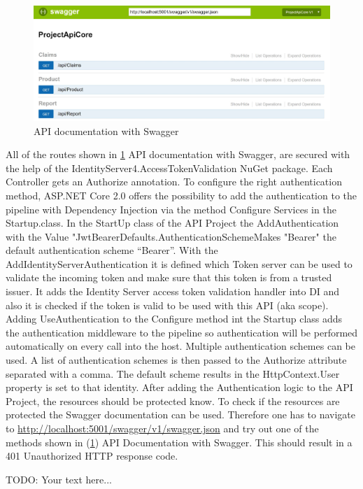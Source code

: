 \begin{figure}[h]
	\centering
	\includegraphics[width=0.7\linewidth]{images/apis}
	\caption{API documentation with Swagger}
	\label{fig:apis}
\end{figure}

All of the routes shown in \ref{fig:apis} API documentation with Swagger, are secured with the help of the IdentityServer4.AccessTokenValidation NuGet package. Each Controller gets an Authorize annotation. 
To configure the right authentication method, ASP.NET Core 2.0 offers the possibility to add the authentication to the pipeline with Dependency Injection via the method Configure Services in the Startup.class.
In the StartUp class of the API Project the AddAuthentication with the Value "JwtBearerDefaults.AuthenticationSchemeMakes "Bearer" the default authentication scheme “Bearer”. With the AddIdentityServerAuthentication it is defined which Token server can be used to validate the incoming token and make sure that this token is from a trusted issuer. It adds the Identity Server access token validation handler into DI and also it is checked if the token is valid to be used with this API (aka scope). Adding UseAuthentication to the Configure method int the Startup class adds the authentication middleware to the pipeline so authentication will be performed automatically on every call into the host.  Multiple authentication schemes can be used. A list of authentication schemes is then passed to the Authorize attribute separated with a comma. The default scheme results in the HttpContext.User property is set to that identity. After adding the Authentication logic to the API Project, the resources should be protected know. To check if the resources are protected the Swagger documentation can be used. Therefore one has to navigate to \url{http://localhost:5001/swagger/v1/swagger.json} and try out one of the methods shown in (\ref{fig:apis}) API Documentation with Swagger. This should result in a 401 Unauthorized HTTP response code.

 

TODO: Your text here...

\chapterend
